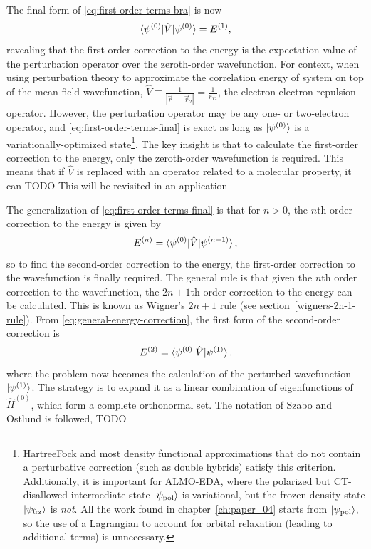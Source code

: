 \documentclass[%
class = book,%
crop = false,%
float = true,%
multi = true,%
preview = false,%
]{standalone}
\let\cite\autocite
\newcommand\hf{Hartree\textendash{}Fock\xspace}%
\begin{document}
The final form of \eqref{eq:first-order-terms-bra} is now
\begin{equation}
  \label{eq:first-order-terms-final}
  \braket{\psi^{(0)} | \hat{V} | \psi^{(0)}} = E^{(1)},
\end{equation}
revealing that the first-order correction to the energy is the expectation value of the perturbation operator over the zeroth-order wavefunction. For context, when using perturbation theory to approximate the correlation energy of system on top of the mean-field wavefunction, \(\hat{V} \equiv \frac{1}{|\vec{r}_{1} - \vec{r}_{2}|} = \frac{1}{r_{12}}\), the electron-electron repulsion operator. However, the perturbation operator may be any one- or two-electron operator, and \eqref{eq:first-order-terms-final} is exact as long as \(\ket{\psi^{(0)}}\) is a variationally-optimized state\footnote{\hf and most density functional approximations that do not contain a perturbative correction (such as double hybrids) satisfy this criterion. Additionally, it is important for ALMO-EDA, where the polarized but CT-disallowed intermediate state \(\ket{\psi_{\text{pol}}}\) is variational, but the frozen density state \(\ket{\psi_{\text{frz}}}\) is \emph{not}. All the work found in chapter~\ref{ch:paper_04} starts from \(\ket{\psi_{\text{pol}}}\), so the use of a Lagrangian to account for orbital relaxation (leading to additional terms) is unnecessary.}. The key insight is that to calculate the first-order correction to the energy, only the zeroth-order wavefunction is required. This means that if \(\hat{V}\) is replaced with an operator related to a molecular property, it can TODO This will be revisited in an application

The generalization of \eqref{eq:first-order-terms-final} is that for \(n > 0\), the \(n\)th order correction to the energy is given by
\begin{equation}
  \label{eq:general-energy-correction}
  E^{(n)} = \braket{\psi^{(0)}|\hat{V}|\psi^{(n-1)}},
\end{equation}
so to find the second-order correction to the energy, the first-order correction to the wavefunction is finally required. The general rule is that given the \(n\)th order correction to the wavefunction, the \(2n+1\)th order correction to the energy can be calculated. This is known as Wigner's \(2n+1\) rule (see section~\ref{wigners-2n-1-rule}). From \eqref{eq:general-energy-correction}, the first form of the second-order correction is
\begin{equation}
  \label{eq:second-order-correction-first-form}
  E^{(2)} = \braket{\psi^{(0)}|\hat{V}|\psi^{(1)}},
\end{equation}
where the problem now becomes the calculation of the perturbed wavefunction \(\ket{\psi^{(1)}}\). The strategy is to expand it as a linear combination of eigenfunctions of \(\hat{H}^{(0)}\), which form a complete orthonormal set. The notation of Szabo and Ostlund\cite{szabo1989modern} is followed, TODO
\end{document}
